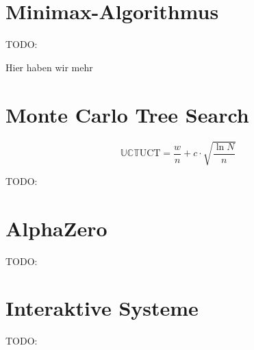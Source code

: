 \section{Minimax-Algorithmus}
\label{chapter:minimax-algorithmus}

TODO:

Hier haben wir mehr

\section{Monte Carlo Tree Search}
\label{chapter:monte-carlo-tree-search}

\begin{equation}
    \mathbb{U}\mathbb{C}\mathbb{T}  \text{UCT} = \frac{w}{n} + c \cdot \sqrt{\frac{\ln N}{n}}
\end{equation}

TODO:

\section{AlphaZero}
\label{chapter:alphazero}

TODO:

\section{Interaktive Systeme}
\label{chapter:interaktive-systeme}

TODO:

